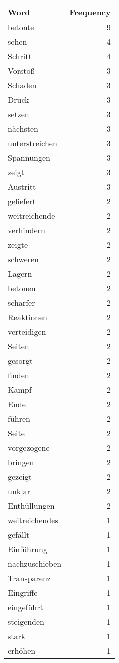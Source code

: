 \begin{tabular}{lr}
\toprule
Word & Frequency \\
\midrule
betonte & 9 \\
sehen & 4 \\
Schritt & 4 \\
Vorstoß & 3 \\
Schaden & 3 \\
Druck & 3 \\
setzen & 3 \\
nächsten & 3 \\
unterstreichen & 3 \\
Spannungen & 3 \\
zeigt & 3 \\
Austritt & 3 \\
geliefert & 2 \\
weitreichende & 2 \\
verhindern & 2 \\
zeigte & 2 \\
schweren & 2 \\
Lagern & 2 \\
betonen & 2 \\
scharfer & 2 \\
Reaktionen & 2 \\
verteidigen & 2 \\
Seiten & 2 \\
gesorgt & 2 \\
finden & 2 \\
Kampf & 2 \\
Ende & 2 \\
führen & 2 \\
Seite & 2 \\
vorgezogene & 2 \\
bringen & 2 \\
gezeigt & 2 \\
unklar & 2 \\
Enthüllungen & 2 \\
weitreichendes & 1 \\
gefällt & 1 \\
Einführung & 1 \\
nachzuschieben & 1 \\
Transparenz & 1 \\
Eingriffe & 1 \\
eingeführt & 1 \\
steigenden & 1 \\
stark & 1 \\
erhöhen & 1 \\

\end{tabular}
